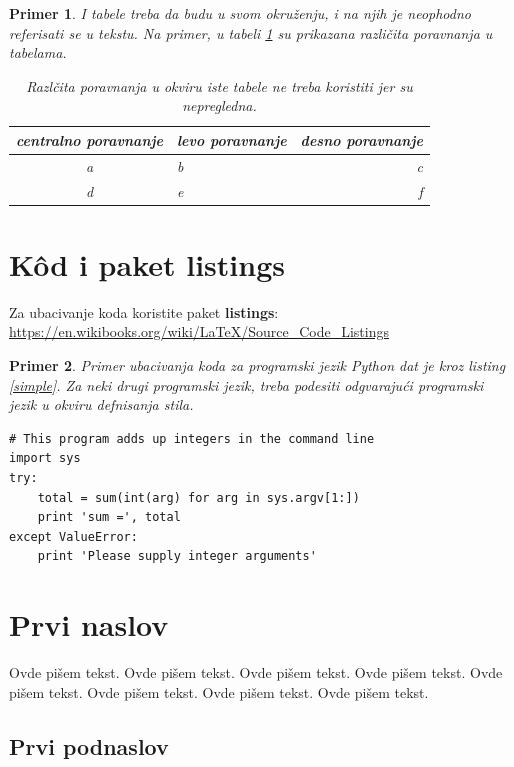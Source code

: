 \documentclass[a4paper]{article}
\newtheorem{primer}{Primer}[section]
\begin{document}
\begin{primer} I tabele treba da budu u svom okruženju, i na njih je neophodno referisati se u tekstu. Na primer, u tabeli \ref{tab:tabela1} su prikazana različita poravnanja u tabelama.

\begin{table}[h!]
\begin{center}
\caption{Razlčita poravnanja u okviru iste tabele ne treba koristiti jer su nepregledna.}
\begin{tabular}{|c|l|r|} \hline
centralno poravnanje& levo poravnanje& desno poravnanje\\ \hline
a &b&c\\ \hline
d &e&f\\ \hline
\end{tabular}
\label{tab:tabela1}
\end{center}
\end{table}

\end{primer}

\section{K\^{o}d i paket listings}
Za ubacivanje koda koristite paket \textbf{listings}:
\url{https://en.wikibooks.org/wiki/LaTeX/Source_Code_Listings}

\begin{primer}
Primer ubacivanja koda za programski jezik Python dat je kroz listing \ref{simple}. Za neki drugi programski jezik, treba podesiti odgvarajući programski jezik u okviru defnisanja stila.
\end{primer}
\begin{lstlisting}[caption={Primer ubacivanja koda u tekst},frame=single, label=simple]
# This program adds up integers in the command line
import sys
try:
    total = sum(int(arg) for arg in sys.argv[1:])
    print 'sum =', total
except ValueError:
    print 'Please supply integer arguments'
\end{lstlisting}


\section{Prvi naslov}
\label{sec:naslov1}


Ovde pišem tekst.
Ovde pišem tekst.
Ovde pišem tekst.
Ovde pišem tekst.
Ovde pišem tekst.
Ovde pišem tekst.
Ovde pišem tekst.
Ovde pišem tekst.


\subsection{Prvi podnaslov}
\label{subsec:podnaslov1}
\end{document}
